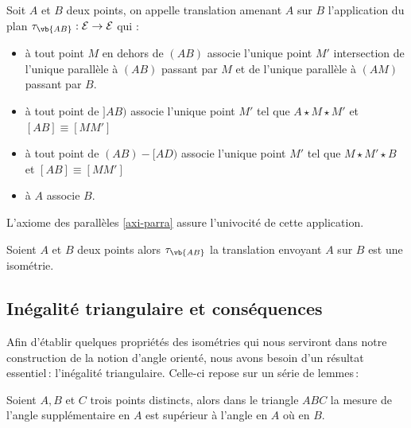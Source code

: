 \begin{defi}[Translation]
    Soit $A$ et $B$ deux points, on appelle translation amenant $A$ sur $B$ l'application du plan $\tau_{\vb{AB}} : \mathcal{E} \to \mathcal{E}$ qui :
    \begin{itemize}[$\bullet$]
        \item à tout point $M$ en dehors de $(AB)$ associe l'unique point $M'$ intersection de l'unique parallèle à $(AB)$ passant par $M$ et de l'unique parallèle à $(AM)$ passant par $B$. 
        \item à tout point de $]AB)$ associe l'unique point $M'$ tel que $A\star M \star M'$ et $[AB]\equiv [MM']$
        \item à tout point de $(AB)-[AD)$ associe l'unique point $M'$ tel que $M\star M' \star B$ et $[AB]\equiv [MM']$
        \item à $A$ associe $B$.
    \end{itemize}
\end{defi}  
\begin{rema}
    L'axiome des parallèles \ref{axi-parra} assure l'univocité de cette application.
\end{rema}
\begin{thm}
    Soient $A$ et $B$ deux points alors $\tau_{\vb{AB}}$ la translation envoyant $A$ sur $B$ est une isométrie. 
\end{thm}

        \subsection{Inégalité triangulaire et conséquences}

Afin d'établir quelques propriétés  des isométries qui nous serviront dans notre construction de la notion d'angle orienté, nous avons besoin d'un résultat essentiel\,: l'inégalité triangulaire. Celle-ci repose sur un série de lemmes\,:


\begin{thm}
    Soient $A,B$ et $C$ trois points distincts, alors dans le triangle $ABC$ la mesure de l'angle supplémentaire en $A$ est supérieur à l'angle en $A$ où en $B$.
\end{thm}

